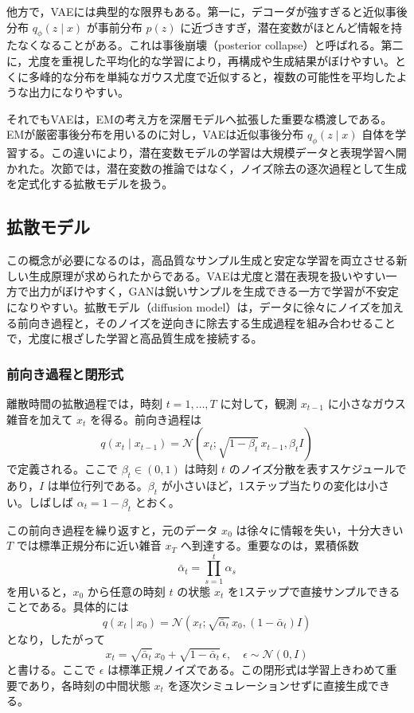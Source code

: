 他方で，VAEには典型的な限界もある。第一に，デコーダが強すぎると近似事後分布 \(q_{\phi}(z \mid x)\) が事前分布 \(p(z)\) に近づきすぎ，潜在変数がほとんど情報を持たなくなることがある。これは事後崩壊（posterior collapse）と呼ばれる。第二に，尤度を重視した平均化的な学習により，再構成や生成結果がぼけやすい。とくに多峰的な分布を単純なガウス尤度で近似すると，複数の可能性を平均したような出力になりやすい。

それでもVAEは，EMの考え方を深層モデルへ拡張した重要な橋渡しである。EMが厳密事後分布を用いるのに対し，VAEは近似事後分布 \(q_{\phi}(z \mid x)\) 自体を学習する。この違いにより，潜在変数モデルの学習は大規模データと表現学習へ開かれた。次節では，潜在変数の推論ではなく，ノイズ除去の逐次過程として生成を定式化する拡散モデルを扱う。

\subsection{拡散モデル}

この概念が必要になるのは，高品質なサンプル生成と安定な学習を両立させる新しい生成原理が求められたからである。VAEは尤度と潜在表現を扱いやすい一方で出力がぼけやすく，GANは鋭いサンプルを生成できる一方で学習が不安定になりやすい。拡散モデル（diffusion model）は，データに徐々にノイズを加える前向き過程と，そのノイズを逆向きに除去する生成過程を組み合わせることで，尤度に根ざした学習と高品質生成を接続する。

\subsubsection{前向き過程と閉形式}

離散時間の拡散過程では，時刻 \(t=1,\dots,T\) に対して，観測 \(x_{t-1}\) に小さなガウス雑音を加えて \(x_t\) を得る。前向き過程は
\[
q(x_t \mid x_{t-1})
=
\mathcal{N}(x_t; \sqrt{1-\beta_t}\,x_{t-1}, \beta_t I)
\]
で定義される。ここで \(\beta_t \in (0,1)\) は時刻 \(t\) のノイズ分散を表すスケジュールであり，\(I\) は単位行列である。\(\beta_t\) が小さいほど，1ステップ当たりの変化は小さい。しばしば \(\alpha_t = 1-\beta_t\) とおく。

この前向き過程を繰り返すと，元のデータ \(x_0\) は徐々に情報を失い，十分大きい \(T\) では標準正規分布に近い雑音 \(x_T\) へ到達する。重要なのは，累積係数
\[
\bar{\alpha}_t = \prod_{s=1}^{t}\alpha_s
\]
を用いると，\(x_0\) から任意の時刻 \(t\) の状態 \(x_t\) を1ステップで直接サンプルできることである。具体的には
\[
q(x_t \mid x_0)
=
\mathcal{N}(x_t; \sqrt{\bar{\alpha}_t}\,x_0, (1-\bar{\alpha}_t)I)
\]
となり，したがって
\[
x_t=\sqrt{\bar{\alpha}_t}\,x_0+\sqrt{1-\bar{\alpha}_t}\,\epsilon,
\quad
\epsilon \sim \mathcal{N}(0,I)
\]
と書ける。ここで \(\epsilon\) は標準正規ノイズである。この閉形式は学習上きわめて重要であり，各時刻の中間状態 \(x_t\) を逐次シミュレーションせずに直接生成できる。

